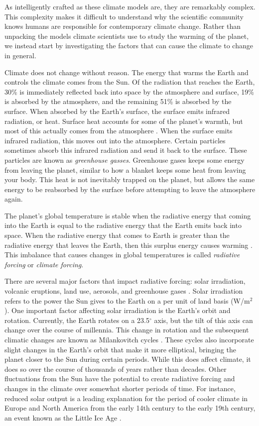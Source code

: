 As intelligently crafted as these climate models are, they are remarkably complex. This complexity makes it difficult to understand why the scientific community knows humans are responsible for contemporary climate change. Rather than unpacking the models climate scientists use to study the warming of the planet, we instead start by investigating the factors that can cause the climate to change in general.

Climate does not change without reason. The energy that warms the Earth and controls the climate comes from the Sun. Of the radiation that reaches the Earth, 30\% is immediately reflected back into space by the atmosphere and surface, 19\% is absorbed by the atmosphere, and the remaining 51\% is absorbed by the surface. When absorbed by the Earth's surface, the surface emits infrared radiation, or heat. Surface heat accounts for some of the planet's warmth, but most of this actually comes from the atmosphere \citep{csi}. When the surface emits infrared radiation, this moves out into the atmosphere. Certain particles sometimes absorb this infrared radiation and send it back to the surface. These particles are known as \emph{greenhouse gasses}. Greenhouse gases keeps some energy from leaving the planet, similar to how a blanket keeps some heat from leaving your body. This heat is not inevitably trapped on the planet, but allows the same energy to be reabsorbed by the surface before attempting to leave the atmosphere again.

The planet's global temperature is stable when the radiative energy that coming into the Earth is equal to the radiative energy that the Earth emits back into space. When the radiative energy that comes to Earth is greater than the radiative energy that leaves the Earth, then this surplus energy causes warming \citep{noaa}. This imbalance that causes changes in global temperatures is called \emph{radiative forcing} or \emph{climate forcing}.

There are several major factors that impact radiative forcing: solar irradiation, volcanic eruptions, land use, aerosols, and greenhouse gases \citep{SINGH202179}. Solar irradiation refers to the power the Sun gives to the Earth on a per unit of land basis (W/m$^2$). One important factor affecting solar irradiation is the Earth's orbit and rotation. Currently, the Earth rotates on a 23.5$^\circ$ axis, but the tilt of this axis can change over the course of millennia. This change in rotation and the subsequent climatic changes are known as Milankovitch cycles \citep{buis2020global}. These cycles also incorporate slight changes in the Earth's orbit that make it more elliptical, bringing the planet closer to the Sun during certain periods. While this does affect climate, it does so over the course of thousands of years rather than decades. Other fluctuations from the Sun have the potential to create radiative forcing and changes in the climate over somewhat shorter periods of time. For instance, reduced solar output is a leading explanation for the period of cooler climate in Europe and North America from the early 14th century to the early 19th century, an event known as the Little Ice Age \citep{little_ice}.

